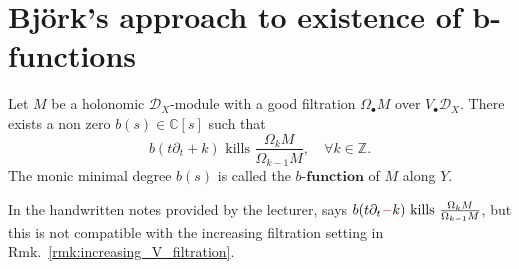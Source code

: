 \section{Bj\"ork's approach to existence of b-functions}\label{sect:Bjork_s_approach_to_existence_of_b-functions}

\begin{theorem}[Bj\"ork]\label{Theorem 8.4}
    Let $M$ be a holonomic $\mathcal{D}_X$-module with a good filtration $\Omega_{\bullet} M$ over $V_{\bullet} \mathcal{D}_X$. There exists a non zero $b(s) \in \mathbb{C}[s]$ such that
    \[
        b(t\partial_t + k) \text{ kills } \frac{\Omega_k M}{\Omega_{k-1} M}, \quad \forall k \in \mathbb{Z}.
    \]
    The monic minimal degree $b(s)$ is called the $\textbf{$b$-function}$ of $M$ along $Y$.
\end{theorem}
\begin{remark}
    In the handwritten notes provided by the lecturer, says $b(t\partial_t \textcolor{red}{ - } k) \text{ kills } \frac{\Omega_k M}{\Omega_{k-1} M}$,
    but this is not compatible with the increasing filtration setting in Rmk.~\ref{rmk:increasing_V_filtration}.
\end{remark}


